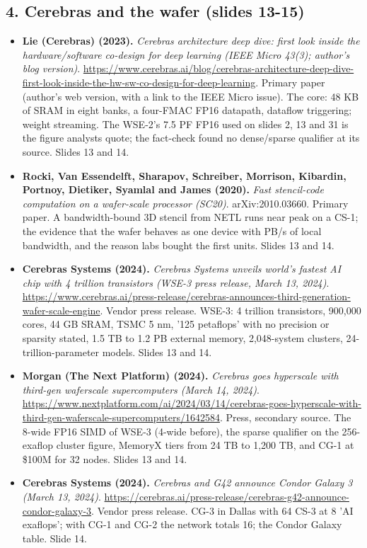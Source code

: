 \subsection*{4. Cerebras and the wafer (slides 13-15)}
\begin{itemize}[leftmargin=1.2em,itemsep=3pt]\sloppy
\item \textbf{Lie (Cerebras) (2023).} \textit{Cerebras architecture deep dive: first look inside the hardware/software co-design for deep learning (IEEE Micro 43(3); author's blog version)}. \url{https://www.cerebras.ai/blog/cerebras-architecture-deep-dive-first-look-inside-the-hw-sw-co-design-for-deep-learning}. Primary paper (author's web version, with a link to the IEEE Micro issue). The core: 48 KB of SRAM in eight banks, a four-FMAC FP16 datapath, dataflow triggering; weight streaming. The WSE-2's 7.5 PF FP16 used on slides 2, 13 and 31 is the figure analysts quote; the fact-check found no dense/sparse qualifier at its source. Slides 13 and 14.
\item \textbf{Rocki, Van Essendelft, Sharapov, Schreiber, Morrison, Kibardin, Portnoy, Dietiker, Syamlal and James (2020).} \textit{Fast stencil-code computation on a wafer-scale processor (SC20)}. arXiv:2010.03660. Primary paper. A bandwidth-bound 3D stencil from NETL runs near peak on a CS-1; the evidence that the wafer behaves as one device with PB/s of local bandwidth, and the reason labs bought the first units. Slides 13 and 14.
\item \textbf{Cerebras Systems (2024).} \textit{Cerebras Systems unveils world's fastest AI chip with 4 trillion transistors (WSE-3 press release, March 13, 2024)}. \url{https://www.cerebras.ai/press-release/cerebras-announces-third-generation-wafer-scale-engine}. Vendor press release. WSE-3: 4 trillion transistors, 900,000 cores, 44 GB SRAM, TSMC 5 nm, '125 petaflops' with no precision or sparsity stated, 1.5 TB to 1.2 PB external memory, 2,048-system clusters, 24-trillion-parameter models. Slides 13 and 14.
\item \textbf{Morgan (The Next Platform) (2024).} \textit{Cerebras goes hyperscale with third-gen waferscale supercomputers (March 14, 2024)}. \url{https://www.nextplatform.com/ai/2024/03/14/cerebras-goes-hyperscale-with-third-gen-waferscale-supercomputers/1642584}. Press, secondary source. The 8-wide FP16 SIMD of WSE-3 (4-wide before), the sparse qualifier on the 256-exaflop cluster figure, MemoryX tiers from 24 TB to 1,200 TB, and CG-1 at \$100M for 32 nodes. Slides 13 and 14.
\item \textbf{Cerebras Systems (2024).} \textit{Cerebras and G42 announce Condor Galaxy 3 (March 13, 2024)}. \url{https://cerebras.ai/press-release/cerebras-g42-announce-condor-galaxy-3}. Vendor press release. CG-3 in Dallas with 64 CS-3 at 8 'AI exaflops'; with CG-1 and CG-2 the network totals 16; the Condor Galaxy table. Slide 14.

\end{itemize}
